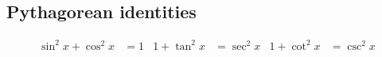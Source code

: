 \subsection*{Pythagorean identities}

\begin{align*}
  \sin^2 x + \cos^2 x &= 1
  &1 + \tan^2 x &= \sec^2 x
  &1 + \cot^2 x &= \csc^2 x
\end{align*}